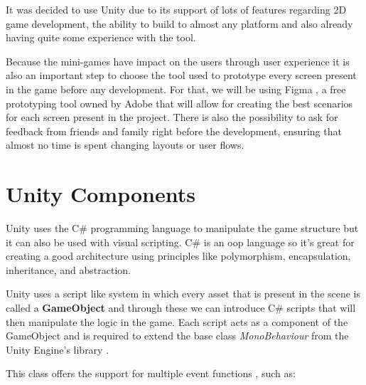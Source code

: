 It was decided to use Unity due to its support of lots of features regarding 2D game development, the ability to build to almost any platform and also already having quite some experience with the tool.

Because the mini-games have impact on the users through user experience it is also an important step to choose the tool used to prototype every screen present in the game before any development. For that, we will be using Figma \cite{figma}, a free prototyping tool owned by Adobe that will allow for creating the best scenarios for each screen present in the project. There is also the possibility to ask for feedback from friends and family right before the development, ensuring that almost no time is spent changing layouts or user flows.

\section{Unity Components}
\label{unityComponents}
Unity uses the C\# programming language to manipulate the game structure but it can also be used with visual scripting. C\# is an \gls{oop} language so it's great for creating a good architecture using principles like polymorphism, encapsulation, inheritance, and abstraction.

Unity uses a script like system in which every asset that is present in the scene is called a \textbf{GameObject} and through these we can introduce C\# scripts that will then manipulate the logic in the game. Each script acts as a component of the GameObject and is required to extend the base class \textit{MonoBehaviour} from the Unity Engine's library \cite{unityDocMonoBehaviour}.

This class offers the support for multiple event functions \cite{unityDocEvent}, such as:

